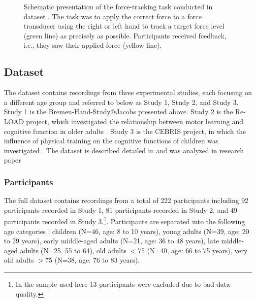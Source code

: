 \begin{figure}[h]
\begin{center}

\caption[Schematic presentation of the force-tracking task conducted in dataset .]{Schematic presentation of the force-tracking task conducted in dataset . The task was to apply the correct force to a force transducer using the right or left hand to track a target force level (green line) as precisely as possible. Participants received feedback, i.e., they saw their applied force (yellow line).}
\label{fig:DSI_exp1}
\end{center}
\end{figure}

\subsection{Dataset }
\label{methods:datasets:II}
The  dataset contains recordings from three experimental studies, each focusing on a different age group and referred to below as Study 1, Study 2, and Study 3.\\
Study 1 is the Bremen-Hand-Study@Jacobs presented above. Study 2 is the Re-LOAD project, which investigated the relationship between motor learning and cognitive function in older adults \cite{HUBNER2018104, Hübner2018}. Study 3 is the CEBRIS project, in which the influence of physical training on the cognitive functions of children was investigated \cite{Koutsandreou2016}. The dataset is described detailed in \cite{Reuter2019} and was analyzed in research paper 

\subsubsection{Participants}
\label{methods:datasets:II:participants}
The full dataset contains recordings from a total of 222 participants including 92 participants recorded in Study 1, 81 participants recorded in Study 2, and 49 participants recorded in Study 3.\footnote{In the sample used here 13 participants were excluded due to bad data quality.}. Participants are separated into the following age categories \cite{Reuter2019}: children (N=46, age: 8 to 10 years), young adults (N=39, age: 20 to 29 years), early middle-aged adults (N=21, age: 36 to 48 years), late middle-aged adults (N=25, 55 to 64), old adults $<$75 (N=40, age: 66 to 75 years), very old adults $>$75 (N=38, age: 76 to 83 years).

